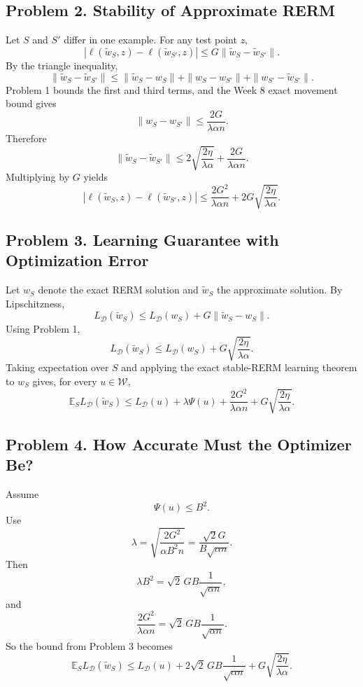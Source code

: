 \documentclass{article}
\newcommand{\EE}{\mathbb{E}}
\newcommand{\cD}{\mathcal{D}}
\newcommand{\cW}{\mathcal{W}}
\begin{document}
\subsection{Problem 2. Stability of Approximate RERM}

Let $S$ and $S'$ differ in one example. For any test point $z$,
$$
|\ell(\widetilde{w}_S,z)-\ell(\widetilde{w}_{S'},z)|
\le
G\|\widetilde{w}_S-\widetilde{w}_{S'}\|.
$$
By the triangle inequality,
$$
\|\widetilde{w}_S-\widetilde{w}_{S'}\|
\le
\|\widetilde{w}_S-w_S\|
+
\|w_S-w_{S'}\|
+
\|w_{S'}-\widetilde{w}_{S'}\|.
$$
Problem 1 bounds the first and third terms, and the Week 8 exact movement bound gives
$$
\|w_S-w_{S'}\|
\le
\frac{2G}{\lambda\alpha n}.
$$
Therefore
$$
\|\widetilde{w}_S-\widetilde{w}_{S'}\|
\le
2\sqrt{\frac{2\eta}{\lambda\alpha}}
+
\frac{2G}{\lambda\alpha n}.
$$
Multiplying by $G$ yields
$$
|\ell(\widetilde{w}_S,z)-\ell(\widetilde{w}_{S'},z)|
\le
\frac{2G^2}{\lambda\alpha n}
+
2G\sqrt{\frac{2\eta}{\lambda\alpha}}.
$$

\subsection{Problem 3. Learning Guarantee with Optimization Error}

Let $w_S$ denote the exact RERM solution and $\widetilde{w}_S$ the approximate solution. By Lipschitzness,
$$
L_{\cD}(\widetilde{w}_S)
\le
L_{\cD}(w_S)
+
G\|\widetilde{w}_S-w_S\|.
$$
Using Problem 1,
$$
L_{\cD}(\widetilde{w}_S)
\le
L_{\cD}(w_S)
+
G\sqrt{\frac{2\eta}{\lambda\alpha}}.
$$
Taking expectation over $S$ and applying the exact stable-RERM learning theorem to $w_S$ gives, for every $u\in\cW$,
$$
\EE_S L_{\cD}(\widetilde{w}_S)
\le
L_{\cD}(u)+\lambda\Psi(u)+\frac{2G^2}{\lambda\alpha n}
+
G\sqrt{\frac{2\eta}{\lambda\alpha}}.
$$

\subsection{Problem 4. How Accurate Must the Optimizer Be?}

Assume
$$
\Psi(u)\le B^2.
$$
Use
$$
\lambda
=
\sqrt{\frac{2G^2}{\alpha B^2 n}}
=
\frac{\sqrt{2}G}{B\sqrt{\alpha n}}.
$$
Then
$$
\lambda B^2
=
\sqrt{2}\,G B\frac{1}{\sqrt{\alpha n}},
$$
and
$$
\frac{2G^2}{\lambda\alpha n}
=
\sqrt{2}\,G B\frac{1}{\sqrt{\alpha n}}.
$$
So the bound from Problem 3 becomes
$$
\EE_S L_{\cD}(\widetilde{w}_S)
\le
L_{\cD}(u)
+
2\sqrt{2}\,GB\frac{1}{\sqrt{\alpha n}}
+
G\sqrt{\frac{2\eta}{\lambda\alpha}}.
$$
\end{document}
